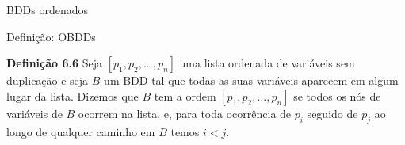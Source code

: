 \expandafter\documentclass\expandafter[table, usenames, svgnames, dvipsnames,14pt, \classopts]{beamer}
\begin{document}
\begin{frame}{\uppercase{BDD}s ordenados}

    \begin{center}
    \end{center}            

\end{frame}

\begin{frame}{Definição: \uppercase{OBDD}s}

    \begin{block}{\textbf{Definição 6.6}}
        Seja $[p_1,p_2,...,p_n]$ uma lista ordenada de variáveis sem duplicação e seja $B$ um BDD tal que todas as suas variáveis aparecem em algum lugar da lista. Dizemos que $B$ tem a ordem $[p_1,p_2,...,p_n]$ se todos os nós de variáveis de $B$ ocorrem na lista, e, para toda ocorrência de $p_i$ seguido de $p_j$ ao longo de qualquer caminho em $B$ temos $i < j$.
    \end{block}

\end{frame}
\end{document}
